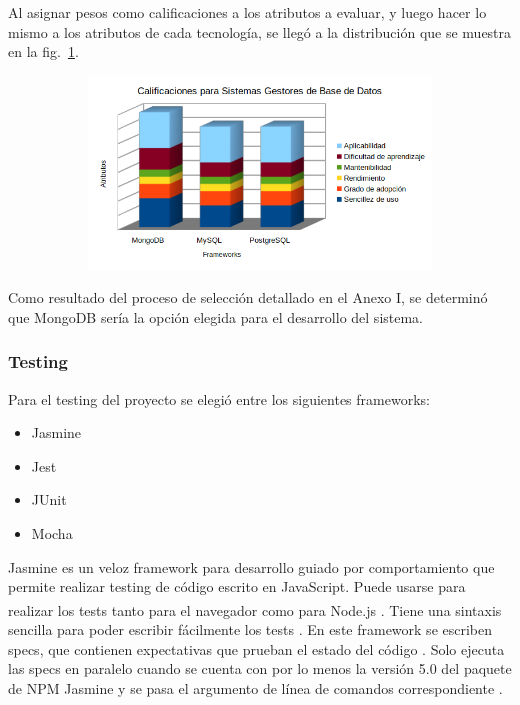 \documentclass[twoside]{article}
\begin{document}
Al asignar pesos como calificaciones a los atributos a evaluar, y luego hacer lo mismo a los atributos de cada tecnología, se llegó a la distribución que se muestra en la fig.~\ref{fig:dbms}.
\begin{figure}[H]
	\caption{Gráfico de calificaciones para Sistemas Gestores de Base de Datos}
    \begin{subfigure}{1\textwidth}
	\includegraphics[width=1\textwidth]{calificaciones para dbms.png}
    \end{subfigure}
	\label{fig:dbms}
\end{figure}
\vspace{-1.0\baselineskip}
Como resultado del proceso de selección detallado en el Anexo I, se determinó que MongoDB sería la opción elegida para el desarrollo del sistema.
\subsubsection{Testing}
Para el testing del proyecto se elegió entre los siguientes frameworks:
\begin{itemize}
    \item Jasmine
    \item Jest
    \item JUnit
    \item Mocha
\end{itemize}
Jasmine es un veloz framework para desarrollo guiado por comportamiento que permite realizar testing de código escrito en JavaScript. Puede usarse para realizar los tests tanto para el navegador como para Node.js \textsuperscript{\textregistered}. Tiene una sintaxis sencilla para poder escribir fácilmente los tests \parencite{jasmineOfficialHome}. En este framework se escriben specs, que contienen expectativas que prueban el estado del código \parencite{jasmineYourFirstSuite}. Solo ejecuta las specs en paralelo cuando se cuenta con por lo menos la versión 5.0 del paquete de NPM Jasmine y se pasa el argumento de línea de comandos correspondiente \parencite{jasmineFrequentlyAskedQuestions}. 
\end{document}
